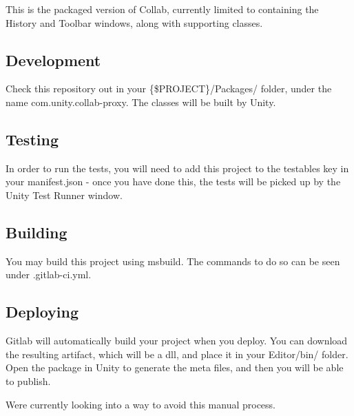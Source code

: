 This is the packaged version of Collab, currently limited to containing the History and Toolbar windows, along with supporting classes.

\subsection*{Development}

Check this repository out in your \{\$\+P\+R\+O\+J\+E\+CT\}/\+Packages/ folder, under the name com.\+unity.\+collab-\/proxy. The classes will be built by Unity.

\subsection*{Testing}

In order to run the tests, you will need to add this project to the testables key in your manifest.\+json -\/ once you have done this, the tests will be picked up by the Unity Test Runner window.

\subsection*{Building}

You may build this project using msbuild. The commands to do so can be seen under .gitlab-\/ci.\+yml.

\subsection*{Deploying}

Gitlab will automatically build your project when you deploy. You can download the resulting artifact, which will be a dll, and place it in your Editor/bin/ folder. Open the package in Unity to generate the meta files, and then you will be able to publish.

We\textquotesingle{}re currently looking into a way to avoid this manual process. 